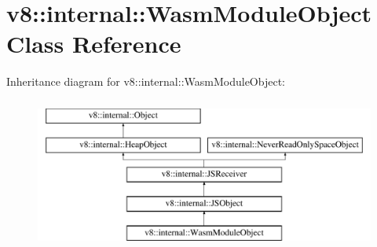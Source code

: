 \hypertarget{classv8_1_1internal_1_1WasmModuleObject}{}\section{v8\+:\+:internal\+:\+:Wasm\+Module\+Object Class Reference}
\label{classv8_1_1internal_1_1WasmModuleObject}
Inheritance diagram for v8\+:\+:internal\+:\+:Wasm\+Module\+Object\+:\begin{figure}[H]
\begin{center}
\leavevmode
\includegraphics[height=5.000000cm]{classv8_1_1internal_1_1WasmModuleObject}
\end{center}
\end{figure}
